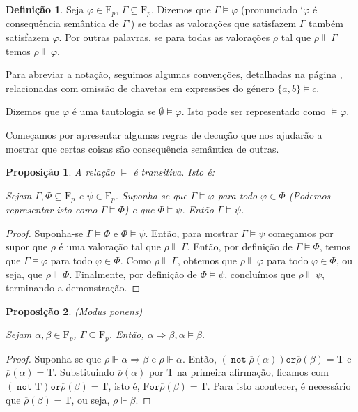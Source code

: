 \documentclass{report}
\newtheorem{prop}{Proposição}
\theoremstyle{definition}
\newtheorem{definicao}{Definição}
\theoremstyle{remark}
\newcommand{\F}{\mathrm{F}}
\newcommand{\lt}{\mathrm{T}}
\newcommand{\lf}{\mathrm{F}}
\DeclareMathOperator{\pnot}{\texttt{not}}
\newcommand{\por}{\mathbin{\texttt{or}}}
\newcommand{\imply}{\mathbin{\Rightarrow}}
\begin{document}
	\begin{definicao}
	Seja $\varphi \in \F_p$, $\Gamma \subseteq \F_p$. Dizemos que $\Gamma \vDash \varphi$ (pronunciado `$\varphi$ é consequência semântica de $\Gamma$') se todas as valorações que satisfazem $\Gamma$ também satisfazem $\varphi$. Por outras palavras, se para todas as valorações $\rho$ tal que $\rho \Vdash \Gamma$ temos $\rho \Vdash \varphi$.
	
	Para abreviar a notação, seguimos algumas convenções, detalhadas na página \pageref{convencao:consequencia}, relacionadas com omissão de chavetas em expressões do género $\{a, b\} \vDash c$.
	
	Dizemos que $\varphi$ é uma tautologia se $\emptyset \vDash \varphi$. Isto pode ser representado como $\vDash \varphi$.
	\end{definicao}
	
	Começamos por apresentar algumas regras de decução que nos ajudarão a mostrar que certas coisas são consequência semântica de outras.
	
	\begin{prop}
	A relação $\vDash$ é transitiva. Isto é:
	
	Sejam $\Gamma, \Phi \subseteq \F_p$ e $\psi \in \F_p$. Suponha-se que $\Gamma \vDash \varphi$ para todo $\varphi \in \Phi$ (Podemos representar isto como $\Gamma \vDash \Phi$) e que $\Phi \vDash \psi$. Então $\Gamma \vDash \psi$.
	\end{prop}
	
	\begin{proof} Suponha-se $\Gamma \vDash \Phi$ e $\Phi \vDash \psi$. Então, para mostrar $\Gamma \vDash \psi$ começamos por supor que $\rho$ é uma valoração tal que $\rho \Vdash \Gamma$. Então, por definição de $\Gamma \vDash \Phi$, temos que $\Gamma \vDash \varphi$ para todo $\varphi \in \Phi$. Como $\rho \Vdash \Gamma$, obtemos que $\rho \Vdash \varphi$ para todo $\varphi \in \Phi$, ou seja, que $\rho \Vdash \Phi$. Finalmente, por definição de $\Phi \vDash \psi$, concluímos que $\rho \Vdash \psi$, terminando a demonstração.
	\end{proof}
	
	\begin{prop} (\textit{Modus ponens}) 
	
	Sejam $\alpha, \beta \in \F_p$, $\Gamma \subseteq \F_p$. Então, $\alpha \imply \beta, \alpha \vDash \beta$.
	\end{prop}
	
	\begin{proof}
	Suponha-se que $\rho \Vdash \alpha \imply \beta$ e $\rho \Vdash \alpha$. Então, $(\pnot\overline\rho(\alpha))\por\overline\rho(\beta) = \lt$ e $\overline\rho(\alpha) = \lt$. Substituindo $\overline\rho(\alpha)$ por $\lt$ na primeira afirmação, ficamos com $(\pnot\lt)\por\overline\rho(\beta) = \lt$, isto é, $\lf \por \overline\rho(\beta) = \lt$. Para isto acontecer, é necessário que $\overline\rho(\beta) = \lt$, ou seja, $\rho \Vdash \beta$.
	\end{proof}
	
\end{document}
